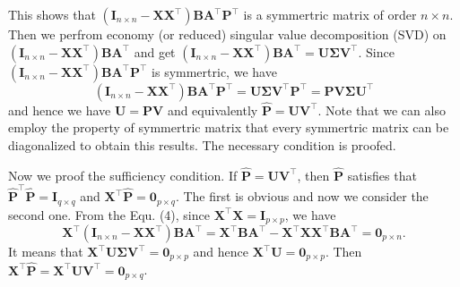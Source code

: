 \documentclass[titlepage,11pt,twoside]{article}
\begin{document}
This shows that $(\mathbf{I}_{n\times n}-\mathbf{X}\mathbf{X}^{\top})\mathbf{B}\mathbf{A}^{\top}\mathbf{P}^{\top}$ is a symmertric matrix of order $n\times n$. Then we perfrom economy (or reduced) singular value decomposition (SVD) on $(\mathbf{I}_{n\times n}-\mathbf{X}\mathbf{X}^{\top})\mathbf{B}\mathbf{A}^{\top}$ and get 
$(\mathbf{I}_{n\times n}-\mathbf{X}\mathbf{X}^{\top})\mathbf{B}\mathbf{A}^{\top}=\mathbf{U}\mathbf{\Sigma}\mathbf{V}^{\top}$.
Since $(\mathbf{I}_{n\times n}-\mathbf{X}\mathbf{X}^{\top})\mathbf{B}\mathbf{A}^{\top}\mathbf{P}^{\top}$ is symmertric, we have
\begin{equation}
(\mathbf{I}_{n\times n}-\mathbf{X}\mathbf{X}^{\top})\mathbf{B}\mathbf{A}^{\top}\mathbf{P}^{\top}
=
\mathbf{U}\mathbf{\Sigma}\mathbf{V}^{\top}\mathbf{P}^{\top}
=
\mathbf{P}\mathbf{V}\mathbf{\Sigma}\mathbf{U}^{\top}
\end{equation}
and hence we have $\mathbf{U}=\mathbf{P}\mathbf{V}$ and equivalently $\mathbf{\hat{P}}=\mathbf{U}\mathbf{V}^{\top}$. Note that we can also employ the property of symmertric matrix that every symmertric matrix can be diagonalized to obtain this results. The necessary condition is proofed. 

Now we proof the sufficiency condition. If $\mathbf{\hat{P}}=\mathbf{U}\mathbf{V}^{\top}$, then $\mathbf{\hat{P}}$ satisfies that $\mathbf{\hat{P}}^{\top}\mathbf{\hat{P}}=\mathbf{I}_{q\times q}$ and $\mathbf{X}^{\top}\mathbf{\hat{P}}=\mathbf{0}_{p\times q}$. The first is obvious and now we consider the second one. From the Equ. (4), since $\mathbf{X}^{\top}\mathbf{X}=\mathbf{I}_{p\times p}$, we have  
\begin{equation}
\mathbf{X}^{\top}(\mathbf{I}_{n\times n}-\mathbf{X}\mathbf{X}^{\top})\mathbf{B}\mathbf{A}^{\top}=\mathbf{X}^{\top}\mathbf{B}\mathbf{A}^{\top}-\mathbf{X}^{\top}\mathbf{X}\mathbf{X}^{\top}\mathbf{B}\mathbf{A}^{\top}
=
\mathbf{0}_{p\times n}
.
\end{equation}
It means that $\mathbf{X}^{\top}\mathbf{U}\mathbf{\Sigma}\mathbf{V}^{\top}=\mathbf{0}_{p\times p}$ and hence $\mathbf{X}^{\top}\mathbf{U}=\mathbf{0}_{p\times p}$. Then $\mathbf{X}^{\top}\mathbf{\hat{P}}=\mathbf{X}^{\top}\mathbf{U}\mathbf{V}^{\top}=\mathbf{0}_{p\times q}$.
\end{document}
